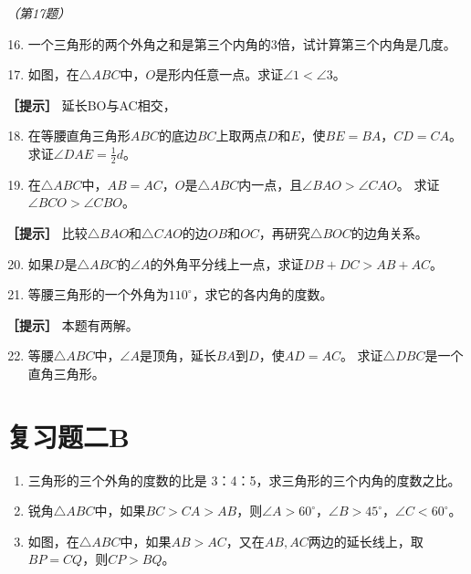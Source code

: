 \emph{（第17题）}

\begin{enumerate}
\setcounter{enumi}{15}
\item
  一个三角形的两个外角之和是第三个内角的3倍，试计算第三个内角是几度。
\item
  如图，在\(\triangle ABC\)中，\(O\)是形内任意一点。求证\(\angle 1 < \angle 3\)。
\end{enumerate}

\textbf{［提示］} 延长BO与AC相交，

\begin{enumerate}
\setcounter{enumi}{17}
\item
  在等腰直角三角形\(ABC\)的底边\(BC\)上取两点\(D\)和\(E\)，使\(BE = BA\)，\(CD = CA\)。
  求证\(\angle DAE = \frac{1}{2} d\)。
\item
  在\(\triangle ABC\)中，\(AB = AC\)，\(O\)是\(\triangle ABC\)内一点，且\(\angle BAO > \angle CAO\)。
  求证\(\angle BCO > \angle CBO\)。
\end{enumerate}

\textbf{［提示］}
比较\(\triangle BAO\)和\(\triangle CAO\)的边\(OB\)和\(OC\)，再研究\(\triangle BOC\)的边角关系。

\begin{enumerate}
\setcounter{enumi}{19}
\item
  如果\(D\)是\(\triangle ABC\)的\(\angle A\)的外角平分线上一点，求证\(DB + DC > AB + AC\)。
\item
  等腰三角形的一个外角为\(110^{\circ}\)，求它的各内角的度数。
\end{enumerate}

\textbf{［提示］} 本题有两解。

\begin{enumerate}
\setcounter{enumi}{21}
\item
  等腰\(\triangle ABC\)中，\(\angle A\)是顶角，延长\(BA\)到\(D\)，使\(AD = AC\)。
  求证\(\triangle DBC\)是一个直角三角形。
\end{enumerate}

\section{复习题二B}

\begin{enumerate}
\item
  三角形的三个外角的度数的比是 3：4：5，求三角形的三个内角的度数之比。
\item
  锐角\(\triangle ABC\)中，如果\(BC > CA > AB\)，则\(\angle A > 60^\circ\)，\(\angle B > 45^\circ\)，\(\angle C < 60^\circ\)。
\item
  如图，在\(\triangle ABC\)中，如果\(AB > AC\)，又在\(AB, AC\)两边的延长线上，取\(BP = CQ\)，则\(CP > BQ\)。
\end{enumerate}

